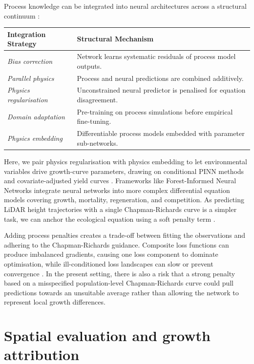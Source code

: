 \documentclass[logo,msc,ai]{infthesis}           %
\begin{document}
Process knowledge can be integrated into neural architectures across a structural continuum \cite{wesselkamp2024Process_C4_NN}:
\begin{table}[ht]
\centering
\scriptsize
\begin{tabular}{ll}
\hline
\textbf{Integration Strategy} & \textbf{Structural Mechanism} \\
\hline
\emph{Bias correction} & Network learns systematic residuals of process model outputs. \\
\emph{Parallel physics} & Process and neural predictions are combined additively. \\
\emph{Physics regularisation} & Unconstrained neural predictor is penalised for equation disagreement. \\
\emph{Domain adaptation} & Pre-training on process simulations before empirical fine-tuning. \\
\emph{Physics embedding} & Differentiable process models embedded with parameter sub-networks. \\
\hline
\end{tabular}
\label{tab:pinn-strategies}
\end{table}
Here, we pair physics regularisation with physics embedding to let environmental variables drive growth-curve parameters, drawing on conditional PINN methods \cite{kovacs2022Conditional_C4_NN,miao2023VCPINN_C4_NN} and covariate-adjusted yield curves \cite{scolforo2013Dominant_C2_CR}. Frameworks like Forest-Informed Neural Networks integrate neural networks into more complex differential equation models covering growth, mortality, regeneration, and competition. As predicting LiDAR height trajectories with a single Chapman-Richards curve is a simpler task, we can anchor the ecological equation using a soft penalty term \cite{pichler2025Inferring_C4_NN}.

Adding process penalties creates a trade-off between fitting the observations and adhering to the Chapman-Richards guidance. Composite loss functions can produce imbalanced gradients, causing one loss component to dominate optimisation, while ill-conditioned loss landscapes can slow or prevent convergence \cite{wang2021Understanding_C4_NN,rathore2024Challenges_C4_NN}. In the present setting, there is also a risk that a strong penalty based on a misspecified population-level Chapman-Richards curve could pull predictions towards an unsuitable average rather than allowing the network to represent local growth differences.

\section{Spatial evaluation and growth attribution}
\label{sec:background-spatial-attribution}
\end{document}
